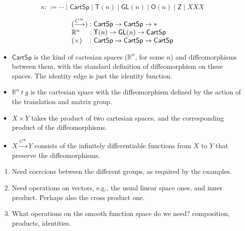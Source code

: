 \documentclass[preprint]{sigplanconf}
\newcommand{\sepbar}{\mathrel|}
\newcommand{\smoothrightarrow}{\stackrel{C^\infty}\longrightarrow}
\theoremstyle{examplestyle}
\begin{document}
\begin{displaymath}
  \kappa ::= \cdots \sepbar \mathsf{CartSp} \sepbar \mathsf{T}(n) \sepbar \mathsf{GL}(n) \sepbar \mathsf{O}(n) \sepbar \mathsf{Z} \sepbar XXX
\end{displaymath}

\begin{displaymath}
  \begin{array}{l@{\hspace{0.3em}}c@{\hspace{0.3em}}l}
    (\smoothrightarrow) &:& \mathsf{CartSp} \to \mathsf{CartSp} \to * \\
    \mathbb{R}^n &:& \mathsf{T}(n) \to \mathsf{GL}(n) \to \mathsf{CartSp} \\
    (\times) &:& \mathsf{CartSp} \to \mathsf{CartSp} \to \mathsf{CartSp}
  \end{array}
\end{displaymath}

\begin{itemize}
\item $\mathsf{CartSp}$ is the kind of cartesian spaces
  ($\mathbb{R}^n$, for some $n$) and diffeomorphisms between them,
  with the standard definition of diffeomorphism on these spaces. The
  identity edge is just the identity function.
\item $\mathbb{R}^n~t~g$ is the cartesian space with the
  diffeomorphism defined by the action of the translation and matrix
  group.
\item $X \times Y$ takes the product of two cartesian spaces, and the
  corresponding product of the diffeomorphisms.
\item $X \smoothrightarrow Y$ consists of the infinitely
  differentiable functions from $X$ to $Y$ that preserve the
  diffeomorphisms.
\end{itemize}

\begin{enumerate}
\item Need coercions between the different groups, as required by the
  examples.
\item Need operations on vectors, e.g., the usual linear space ones,
  and inner product. Perhaps also the cross product one.
\item What operations on the smooth function space do we need?
  composition, products, identities.
\end{enumerate}
\end{document}
